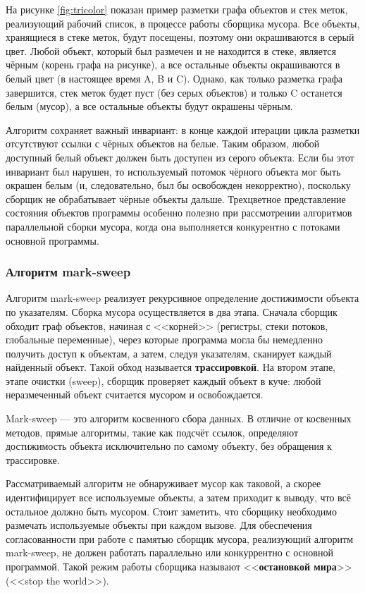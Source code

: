 На рисунке \ref{fig:tricolor} показан пример разметки графа объектов и стек меток, реализующий рабочий список, в процессе работы сборщика мусора. Все объекты, хранящиеся в стеке меток, будут посещены, поэтому они окрашиваются в серый цвет. Любой объект, который был размечен и не находится в стеке, является чёрным (корень графа на рисунке), а все остальные объекты окрашиваются в белый цвет (в настоящее время A, B и C). Однако, как только разметка графа завершится, стек меток будет пуст (без серых объектов) и только C останется белым (мусор), а все остальные объекты будут окрашены чёрным.

Алгоритм сохраняет важный инвариант: в конце каждой итерации цикла разметки отсутствуют ссылки с чёрных объектов на белые. Таким образом, любой доступный белый объект должен быть доступен из серого объекта. Если бы этот инвариант был нарушен, то используемый потомок чёрного объекта мог быть окрашен белым (и, следовательно, был бы освобожден некорректно), поскольку сборщик не обрабатывает чёрные объекты дальше. Трехцветное представление состояния объектов программы особенно полезно при рассмотрении алгоритмов параллельной сборки мусора, когда она выполняется конкурентно с потоками основной программы. \cite{handbook}



\subsubsection{Алгоритм mark-sweep}
\label{mark-sweep}

Алгоритм mark-sweep реализует рекурсивное определение достижимости объекта по указателям. Сборка мусора осуществляется в два этапа. Сначала сборщик обходит граф объектов, начиная с <<корней>> (регистры, стеки потоков, глобальные переменные), через которые программа могла бы немедленно получить доступ к объектам, а затем, следуя указателям, сканирует каждый найденный объект. Такой обход называется \textbf{трассировкой}. На втором этапе, этапе очистки (sweep), сборщик проверяет каждый объект в куче: любой неразмеченный объект считается мусором и освобождается. \cite{handbook}

Mark-sweep --- это алгоритм косвенного сбора данных. В отличие от косвенных методов, прямые алгоритмы, такие как подсчёт ссылок, определяют достижимость объекта исключительно по самому объекту, без обращения к трассировке.  \cite{handbook}

Рассматриваемый алгоритм не обнаруживает мусор как таковой, а скорее идентифицирует все используемые объекты, а затем приходит к выводу, что всё остальное должно быть мусором. Стоит заметить, что сборщику необходимо размечать используемые объекты при каждом вызове. Для обеспечения согласованности при работе с памятью сборщик мусора, реализующий алгоритм mark-sweep, не должен работать параллельно или конкуррентно с основной программой. Такой режим работы сборщика называют <<\textbf{остановкой мира}>> (<<stop the world>>). \cite{handbook}

